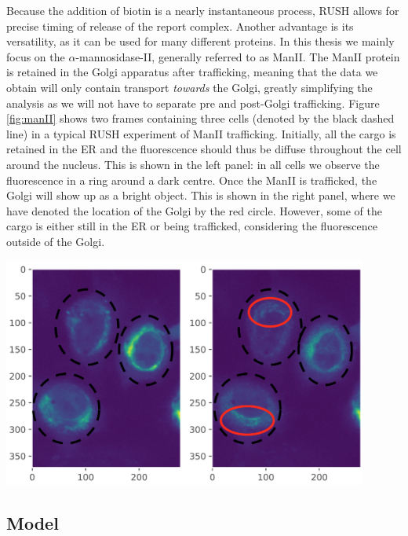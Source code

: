 \documentclass{Dissertate}
\let\origfigure\figure
\let\endorigfigure\endfigure
\renewenvironment{figure}[1][2] {
    \expandafter\origfigure\expandafter[H]
} {
    \endorigfigure
}
\begin{document}
Because the addition of biotin is a nearly instantaneous process, RUSH allows for precise timing of release of the report complex. Another advantage is its versatility, as it can be used for many different proteins. In this
thesis we mainly focus on the \(\alpha\)-mannosidase-II, generally
referred to as ManII. The ManII protein is retained in the Golgi apparatus
after trafficking, meaning that the data we
obtain will only contain transport \emph{towards} the Golgi, greatly
simplifying the analysis as we will not have to separate pre and post-Golgi trafficking.
Figure \ref{fig:manII} shows two frames containing three cells (denoted by the black dashed line) in a typical RUSH
experiment of ManII trafficking.  Initially, all the cargo is retained in the ER and the fluorescence should thus be diffuse throughout the cell around the nucleus. This is shown in the left panel: in all cells we observe the fluorescence in a ring around a dark centre. Once the ManII is trafficked, the Golgi will show up as a bright object. This is shown in the right panel, where we have denoted the location of the Golgi by the red circle. However, some of the cargo is either still in the ER or being trafficked, considering the fluorescence outside of the Golgi.

\begin{figure}
\hypertarget{fig:manII}{%
\centering
\includegraphics[width=0.9\textwidth]{source/figures/png/frames.png}
\caption{Two frames of the ManII transport images using the RUSH
technique.}\label{fig:manII}
}
\end{figure}

\hypertarget{model}{%
\subsection{Model}\label{model}}
\end{document}
